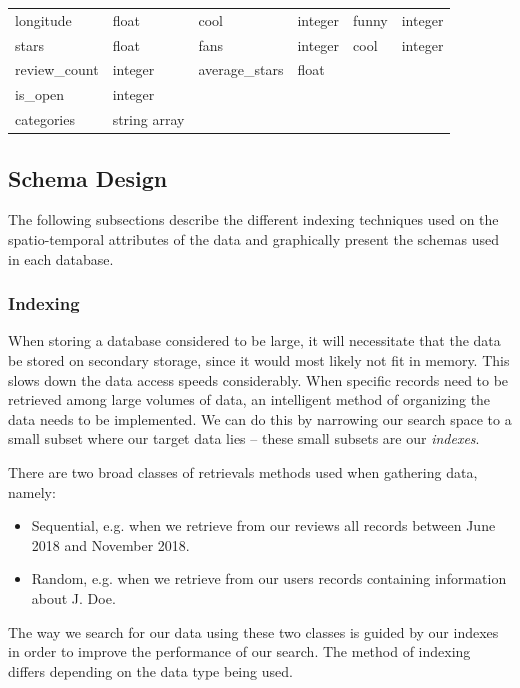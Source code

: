 \begin{table}[h]
\begin{tabular}{ |p{2cm}|p{2cm}||p{2cm}|p{2cm}||p{2cm}|p{2cm}|}
        longitude                       & float                       & cool                         & integer      & funny        & integer   \\
        stars                           & float                       & fans                         & integer      & cool         & integer   \\
        review\_count                   & integer                     & average\_stars               & float        &              &           \\
        is\_open                        & integer                     &                              &              &              &           \\
        categories                      & string array                &                              &              &              &           \\
        \hline
    \end{tabular}
    \label{tab:yelp-data}
\end{table}

\subsection{Schema Design}

The following subsections describe the different indexing techniques used on the spatio-temporal attributes of the data and graphically present the schemas used in each database.

\subsubsection{Indexing}
When storing a database considered to be large, it will necessitate that the data be stored on secondary storage, since it would most likely not fit in memory. This slows down the data access speeds considerably. When specific records need to be retrieved among large volumes of data, an intelligent method of organizing the data needs to be implemented. We can do this by narrowing our search space to a small subset where our target data lies -- these small subsets are our \emph{indexes}.

There are two broad classes \cite{btree} of retrievals methods used when gathering data, namely:
\begin{itemize}
    \item Sequential, e.g. when we retrieve from our reviews all records between June 2018 and November 2018.
    \item Random, e.g. when we retrieve from our users records containing information about J. Doe.
\end{itemize}
The way we search for our data using these two classes is guided by our indexes in order to improve the performance of our search. The method of indexing differs depending on the data type being used.

